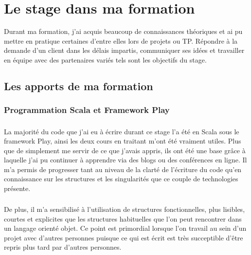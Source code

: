 
\chapter{Le stage dans ma formation} %

\label{formation} %


Durant ma formation, j’ai acquis beaucoup de connaissances théoriques et ai pu mettre en pratique certaines d’entre elles lors de projets ou TP.
Répondre à la demande d’un client dans les délais impartis, communiquer ses idées et travailler en équipe avec des partenaires variés tels sont les objectifs du stage.


\section{Les apports de ma formation}

\subsection{Programmation Scala et Framework Play}
\label{sub:Programmation Scala et Framework Play}
\paragraph{}
La majorité du code que j'ai eu à écrire durant ce stage l'a été en Scala sous le framework Play, ainsi les deux cours en traitant m'ont été vraiment utiles.
Plus que de simplement me servir de ce que j'avais appris, ils ont été une base grâce à laquelle j'ai pu continuer à apprendre via des blogs ou des conférences en ligne.
Il m'a permis de progresser tant au niveau de la clarté de l'écriture du code qu'en connaissance sur les structures et les singularités que ce couple de technologies présente.
\paragraph{}
De plus, il m'a sensibilisé à l'utilisation de structures fonctionnelles, plus lisibles, courtes et explicites que les structures habituelles que l'on peut rencontrer dans un langage orienté objet.
Ce point est primordial lorsque l'on travail au sein d'un projet avec d'autres personnes puisque ce qui est écrit est très succeptible d'être repris plus tard par d'autres personnes.

